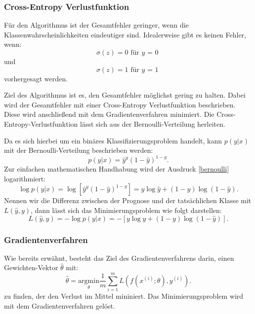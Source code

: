 \subsubsection{Cross-Entropy Verlustfunktion}
Für den Algorithmus ist der Gesamtfehler geringer, wenn die Klassenwahrscheinlichkeiten eindeutiger sind. Idealerweise gibt es keinen Fehler, wenn: 
\begin{equation}
\sigma(z) =  0 \textrm{ für $y$ = 0 } \label{p(y=0)}  
\end{equation}
und 
\begin{equation}
\sigma(z) =  1 \textrm{ für $y$ = 1 } \label{p(y=0)}  
\end{equation}
vorhergesagt werden. 

Ziel des Algorithmus ist es, den Gesamtfehler möglichst gering zu halten. Dabei wird der Gesamtfehler mit einer Cross-Entropy Verlustfunktion beschrieben. Diese wird anschließend mit dem Gradientenverfahren minimiert. 
Die Cross-Entropy-Verlustfunktion lässt sich aus der Bernoulli-Verteilung herleiten.

Da es sich hierbei um ein binäres Klassifizierungsproblem handelt, kann  $p(y|x)$ mit der Bernoulli-Verteilung beschrieben werden:
\begin{equation}
 p(y|x) =  \hat{y}^y (1-\hat{y})^{1-y}.  \label{bernoulli}  
\end{equation}
Zur einfachen mathematischen Handhabung wird der Ausdruck \ref{bernoulli} logarithmiert:
\begin{equation}
\log p(y|x) =  \log [\hat{y}^y  (1-\hat{y})^{1-y}] = y \log \hat{y} + (1-y) \log (1-\hat{y}).  \label{log bernoulli}  
\end{equation}
Nennen wir die Differenz zwischen der Prognose und der tatsächlichen Klasse mit $L(\hat{y}, y)$, dann lässt sich das Minimierungsproblem wie folgt darstellen:
\begin{equation}
L(\hat{y}, y) =  -\log p(y|x) = - [ y \log \hat{y} + (1-y) \log (1-\hat{y})]. \label{Verlustfunktion}  
\end{equation}

\subsubsection{Gradientenverfahren} \label{subsubsec:Gradientenverfahren}
Wie bereits erwähnt, besteht das Ziel des Gradientenverfahrens darin, einen Gewichten-Vektor $\hat{\theta}$ mit: 
\begin{equation}
\hat{\theta} = \underset{\theta}{\text{argmin}} \frac{1}{m} \sum_{i=1}^{m} L (f(x^{(i)};\theta),y^{(i)}). \label{Gradient}
\end{equation}
zu finden, der den Verlust im Mittel mininiert. Das Minimierungsproblem wird mit dem Gradientenverfahren gelöst.

